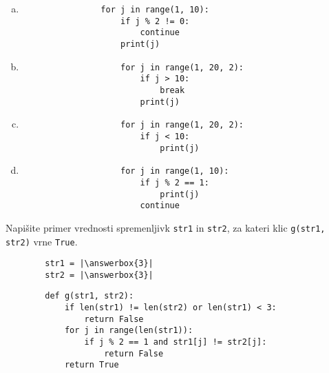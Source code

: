 \documentclass[arhiv, 10pt]{../izpit}
\newcommand{\inlinepy}[1]{\texttt{#1}}
\newcommand{\answerbox}[1]{\framebox{\vphantom{\large M}\hspace{#1cm}}}
\begin{document}
        \begin{multicols}{2}
        \begin{enumerate}[(a)]
\item 
            \begin{verbatim}
                for j in range(1, 10):
                    if j % 2 != 0:
                        continue
                    print(j)
            \end{verbatim}
        
\item 
                \begin{verbatim}
                    for j in range(1, 20, 2):
                        if j > 10:
                            break
                        print(j)
                \end{verbatim}
            
\item 
                \begin{verbatim}
                    for j in range(1, 20, 2):
                        if j < 10:
                            print(j)
                \end{verbatim}
            
\item 
                \begin{verbatim}
                    for j in range(1, 10):
                        if j % 2 == 1:
                            print(j)
                        continue
                \end{verbatim}
            
\end{enumerate}

        \end{multicols}
    
        \naloga*
        \begin{multicols}{2}
        \noindent
        Napišite primer vrednosti spremenljivk \inlinepy{str1} in \inlinepy{str2}, za kateri klic \inlinepy{g(str1, str2)} vrne \inlinepy{True}.
        \begin{verbatim}
        str1 = |\answerbox{3}|
        str2 = |\answerbox{3}|
        \end{verbatim}
        \vfil
        \columnbreak
        \begin{verbatim}
        def g(str1, str2):
            if len(str1) != len(str2) or len(str1) < 3:
                return False
            for j in range(len(str1)):
                if j % 2 == 1 and str1[j] != str2[j]:
                    return False
            return True
        \end{verbatim}
        \end{multicols}
    
\end{document}
